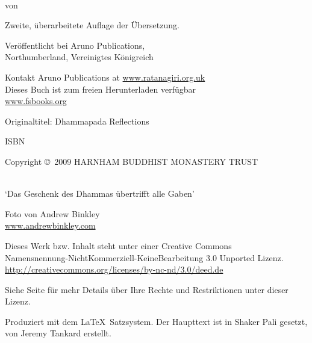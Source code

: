 \cleartoverso
\thispagestyle{empty}
{\copyrightsize\setlength{\parskip}{0.5\baselineskip}\setlength{\parindent}{0em}%
\raggedright%
\shaker\color[gray]{0.3}

\thetitle\\
von \theauthor

Zweite, überarbeitete Auflage der Übersetzung.

Veröffentlicht bei Aruno Publications,\\
Northumberland, Vereinigtes Königreich

Kontakt Aruno Publications at \href{http://ratanagiri.org.uk/}{www.ratanagiri.org.uk}\\
Dieses Buch ist zum freien Herunterladen verfügbar\\
\href{http://fsbooks.org/}{www.fsbooks.org}

Originaltitel: Dhammapada Reflections

ISBN \theISBN

Copyright \copyright\ 2009 HARNHAM BUDDHIST MONASTERY TRUST

\\
`Das Geschenk des Dhammas übertrifft alle Gaben'

Foto von Andrew Binkley\\
\href{http://andrewbinkley.com}{www.andrewbinkley.com}

{\tiny
Dieses Werk bzw. Inhalt steht unter einer Creative Commons\\
Namensnennung-NichtKommerziell-KeineBearbeitung 3.0 Unported Lizenz.\\
\href{http://creativecommons.org/licenses/by-nc-nd/3.0/deed.de}{http://creativecommons.org/licenses/by-nc-nd/3.0/deed.de}

Siehe Seite \pageref{copyright-details} für mehr Details über Ihre Rechte und Restriktionen unter dieser Lizenz.

Produziert mit dem \LaTeX\ Satzsystem. Der Haupttext ist in Shaker Pali gesetzt, von Jeremy Tankard erstellt.

\theEditionInfo

}}

